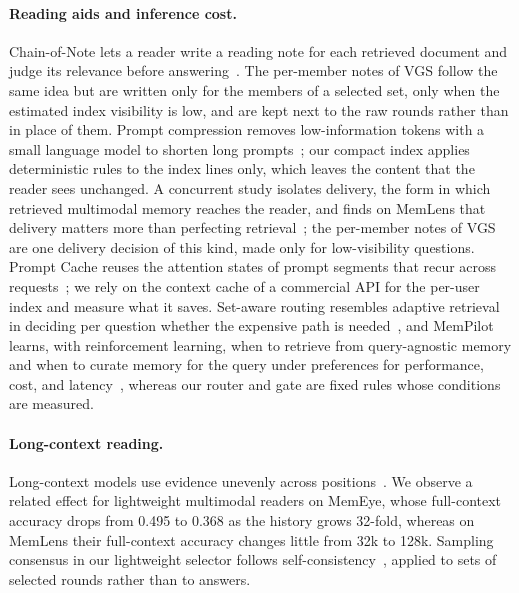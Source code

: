 \paragraph{Reading aids and inference cost.} Chain-of-Note lets a reader write a reading note for each retrieved document and judge its relevance before answering~\citep{yu2023chainofnote}. The per-member notes of VGS follow the same idea but are written only for the members of a selected set, only when the estimated index visibility is low, and are kept next to the raw rounds rather than in place of them. Prompt compression removes low-information tokens with a small language model to shorten long prompts~\citep{jiang2023llmlingua}; our compact index applies deterministic rules to the index lines only, which leaves the content that the reader sees unchanged. A concurrent study isolates delivery, the form in which retrieved multimodal memory reaches the reader, and finds on MemLens that delivery matters more than perfecting retrieval~\citep{jiang2026delivery}; the per-member notes of VGS are one delivery decision of this kind, made only for low-visibility questions. Prompt Cache reuses the attention states of prompt segments that recur across requests~\citep{gim2023promptcache}; we rely on the context cache of a commercial API for the per-user index and measure what it saves. Set-aware routing resembles adaptive retrieval in deciding per question whether the expensive path is needed~\citep{jeong2024adaptiverag}, and MemPilot learns, with reinforcement learning, when to retrieve from query-agnostic memory and when to curate memory for the query under preferences for performance, cost, and latency~\citep{zhang2026mempilot}, whereas our router and gate are fixed rules whose conditions are measured.

\paragraph{Long-context reading.} Long-context models use evidence unevenly across positions~\citep{liu2024lost}. We observe a related effect for lightweight multimodal readers on MemEye, whose full-context accuracy drops from 0.495 to 0.368 as the history grows 32-fold, whereas on MemLens their full-context accuracy changes little from 32k to 128k. Sampling consensus in our lightweight selector follows self-consistency~\citep{wang2023selfconsistency}, applied to sets of selected rounds rather than to answers.
